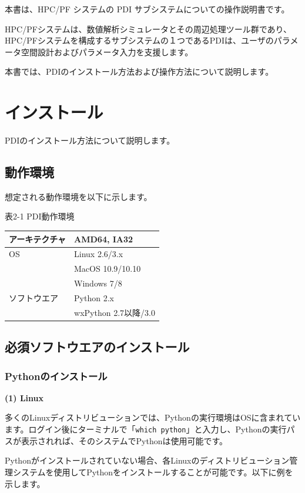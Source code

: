 \documentclass[a4paper,11pt]{jarticle}
\begin{document}
本書は、HPC/PF システムの PDI サブシステムについての操作説明書です。


HPC/PFシステムは、数値解析シミュレータとその周辺処理ツール群であり、HPC/PFシステムを構成するサブシステムの１つであるPDIは、ユーザのパラメータ空間設計およびパラメータ入力を支援します。


本書では、PDIのインストール方法および操作方法について説明します。

\newpage
\section{インストール}

\vspace{12pt}
PDIのインストール方法について説明します。

\subsection{動作環境}

想定される動作環境を以下に示します。

表2-1 PDI動作環境

\begin{tabular}{|l|l|}
\hline
アーキテクチャ & AMD64, IA32\\ \hline
OS & Linux 2.6/3.x\\
   & MacOS 10.9/10.10\\
   & Windows 7/8\\ \hline
ソフトウエア & Python 2.x\\
             & wxPython 2.7以降/3.0\\ \hline
\end{tabular}

\subsection{必須ソフトウエアのインストール}

\subsubsection{Pythonのインストール}

\textbf{(1) Linux}

多くのLinuxディストリビューションでは、Pythonの実行環境はOSに含まれています。ログイン後にターミナルで「{\tt which python}」と入力し、Pythonの実行パスが表示されれば、そのシステムでPythonは使用可能です。

Pythonがインストールされていない場合、各Linuxのディストリビューション管理システムを使用してPythonをインストールすることが可能です。以下に例を示します。
\end{document}
